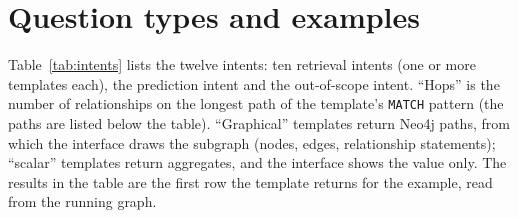 \documentclass[10pt,a4paper]{article}
\newcommand{\code}[1]{\texttt{#1}}
\begin{document}
\section{Question types and examples}\label{sec:types}

Table~\ref{tab:intents} lists the twelve intents: ten retrieval intents (one or more templates each), the prediction intent and the out-of-scope intent. ``Hops'' is the number of relationships on the longest path of the template's \code{MATCH} pattern (the paths are listed below the table). ``Graphical'' templates return Neo4j paths, from which the interface draws the subgraph (nodes, edges, relationship statements); ``scalar'' templates return aggregates, and the interface shows the value only. The results in the table are the first row the template returns for the example, read from the running graph.
\end{document}
